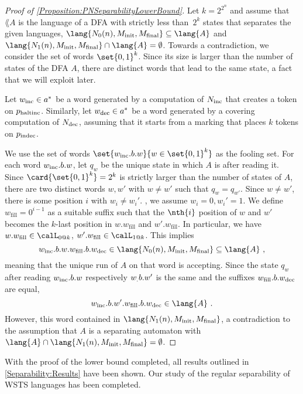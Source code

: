 \documentclass[../../diss.tex]{subfiles}
\begin{document}
\begin{proof}[Proof of \cref{Proposition:PNSeparabilityLowerBound}]
    Let $k = 2^{2^n}$ and assume that $\lang{A}$ is the language of a DFA with strictly less than~$2^k$ states that separates the given languages, \ie $\lang{N_0(n),\Minit,\Mfinal} \subseteq \lang{A}$ and $\lang{N_1(n),\Minit,\Mfinal} \cap \lang{A} = \emptyset$.
    Towards a contradiction, we consider the set of words $\set{0,1}^k$.
    Since its size is larger than the number of states of the DFA $A$, there are distinct words that lead to the same state, a fact that we will exploit later.

    Let $w_{\text{inc}} \in a^*$ be a word generated by a computation of $N_{\text{inc}}$ that creates a token on $p_{\text{haltinc}}$.
    Similarly, let $w_{\text{dec}} \in a^*$ be a word generated by a covering computation of $N_{\text{dec}}$, assuming that it starts from a marking that places $k$ tokens on $p_{\text{indec}}$.

    We use the set of words $\set{ w_\textinc.b.w }{ w \in \set{0,1}^k}$ as the fooling set.
    For each word $w_{\text{inc}}.b.w$, let $q_w$ be the unique state in which $A$ is after reading it.
    Since $\card{\set{0,1}^k} = 2^k$ is strictly larger than the number of states of $A$, there are two distinct words $w,w'$ with $w \neq w'$ such that $q_{w} = q_{w'}$.
    Since $w \neq w'$, there is some position $i$ with $w_i \neq w_i'$.
    \Wolog, we assume $w_i = 0, w_i' = 1$.
    We define $w_{\text{fill}} = 0^{i-1}$ as a suitable suffix such that the $\nth{i}$ position  of $w$ and $w'$ becomes the $k$-last position in $w.w_{\text{fill}}$ and $w'.w_{\text{fill}}$.
    In particular, we have $w.w_{\text{fill}} \in \calL_{0 @ k}$, $w'.w_{\text{fill}} \in \calL_{1 @ k}$.
%
    This implies
    \[
        w_\textinc.b.w.w_{\text{fill}}.b.w_\textdec \in \lang{N_0(n),\Minit,\Mfinal} \subseteq \lang{A}
        \ ,
    \]
    meaning that the unique run of $A$ on that word is accepting.
    Since the state $q_w$ after reading $w_{\text{inc}}.b.w$ respectively $w_\text.b.w'$ is the same and the suffixes $w_{\text{fill}}.b.w_{\text{dec}}$ are equal,
    \[
        w_\textinc.b.w'.w_{\text{fill}}.b.w_\textdec \in \lang{A}
        \ .
    \]
    However, this word contained in $\lang{N_1(n),\Minit,\Mfinal}$, a contradiction to the assumption that $A$ is a separating automaton with $\lang{A} \cap \lang{N_1(n),\Minit,\Mfinal} = \emptyset$.
\end{proof}

With the proof of the lower bound completed, all results outlined in \cref{Separability:Results} have been shown.
Our study of the regular separability of WSTS languages has been completed.
\end{document}
